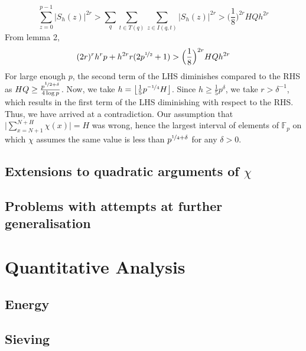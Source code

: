 \documentclass{report}
\begin{document}
$$\sum\limits_{z=0}^{p-1}\lvert S_h(z) \rvert^{2r}> \sum_q\sum\limits_{t\in T(q)}\sum\limits_{z\in I(q,t)}\lvert S_h(z) \rvert^{2r}> \Big(\frac{1}{8}\Big)^{2r}HQh^{2r}$$
From lemma 2,
$$(2r)^{r}h^{r}p+h^{2r}r(2p^{\nicefrac{1}{2}}+1)>\Big(\frac{1}{8}\Big)^{2r}HQh^{2r}$$
For large enough $p$, the second term of the LHS diminishes compared to the RHS as $HQ\geq \frac{p^{\nicefrac{1}{2}+\delta}}{4\log p}$. Now, we take $h=\left \lfloor \frac{1}{5}p^{\nicefrac{-1}{4}}H \right \rfloor$. Since $h \geq \frac{1}{5}p^{\delta}$, we take $r>\delta^{-1}$, which results in the first term of the LHS diminishing with respect to the RHS.
Thus, we have arrived at a contradiction. Our assumption that $\Big \lvert \sum\limits_{x=N+1}^{N+H}\chi(x)\Big \rvert=H$ was wrong, hence the largest interval of elements of $\mathbb{F}_p$ on which $\chi$ assumes the same value is less than $p^{\nicefrac{1}{4}+\delta}$ for any $\delta>0$.
%
%
\section{Extensions to quadratic arguments of $\chi$}
%
%
\section{Problems with attempts at further generalisation}
\chapter{Quantitative Analysis}
\section{Energy}
%
%
\section{Sieving}
%
%
\end{document}
